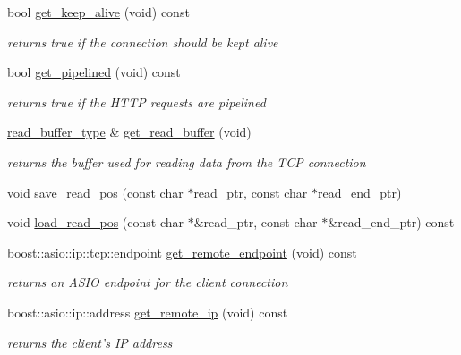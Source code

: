 \begin{DoxyCompactItemize}
bool \hyperlink{classpion_1_1tcp_1_1connection_a35394d8c3f144ab8a264824410bb7088}{get\-\_\-keep\-\_\-alive} (void) const 
\begin{DoxyCompactList}\small\item\em returns true if the connection should be kept alive \end{DoxyCompactList}\item 
bool \hyperlink{classpion_1_1tcp_1_1connection_aa54a75a48eae812955f7ce6b2b4c3d51}{get\-\_\-pipelined} (void) const 
\begin{DoxyCompactList}\small\item\em returns true if the H\-T\-T\-P requests are pipelined \end{DoxyCompactList}\item 
\hyperlink{classpion_1_1tcp_1_1connection_abd482572a19c1aecadaccd360837f7c2}{read\-\_\-buffer\-\_\-type} \& \hyperlink{classpion_1_1tcp_1_1connection_a9ffefe15c4ae6acf85e13b315fbfc72b}{get\-\_\-read\-\_\-buffer} (void)
\begin{DoxyCompactList}\small\item\em returns the buffer used for reading data from the T\-C\-P connection \end{DoxyCompactList}\item 
void \hyperlink{classpion_1_1tcp_1_1connection_a7951ebfca8e6834faa78417c5e87a748}{save\-\_\-read\-\_\-pos} (const char $\ast$read\-\_\-ptr, const char $\ast$read\-\_\-end\-\_\-ptr)
\item 
void \hyperlink{classpion_1_1tcp_1_1connection_a4cc9d7185adda632de1f3482552ed5f6}{load\-\_\-read\-\_\-pos} (const char $\ast$\&read\-\_\-ptr, const char $\ast$\&read\-\_\-end\-\_\-ptr) const 
\item 
boost\-::asio\-::ip\-::tcp\-::endpoint \hyperlink{classpion_1_1tcp_1_1connection_a63bb4969a3816db01b1e85301ca1af91}{get\-\_\-remote\-\_\-endpoint} (void) const 
\begin{DoxyCompactList}\small\item\em returns an A\-S\-I\-O endpoint for the client connection \end{DoxyCompactList}\item 
boost\-::asio\-::ip\-::address \hyperlink{classpion_1_1tcp_1_1connection_a4863b8d10797ef101c95c660007a8c62}{get\-\_\-remote\-\_\-ip} (void) const 
\begin{DoxyCompactList}\small\item\em returns the client's I\-P address \end{DoxyCompactList}\item 

\end{DoxyCompactItemize}
